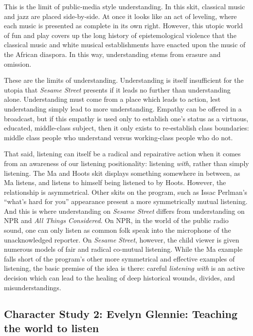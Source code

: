 \documentclass[12pt,letterpaper]{article}
\newcommand{\ses}{\textit{Sesame Street }}
\begin{document}
	This is the limit of public-media style understanding. In this skit, 
	classical music and jazz are placed side-by-side. At once it looks like
	an act of leveling, where each music is presented as complete in its own
	right. However, this utopic world of fun and play covers up the long 
	history of epistemological violence that the classical music and white 
	musical establishments have enacted upon the music of the African 
	diaspora. In this way, understanding stems from erasure and omission.

	These are the limits of understanding. Understanding is itself 
	insufficient for the utopia that \ses presents if it leads no further 
	than understanding alone. Understanding must come from a place which 
	leads to
	 action, lest understanding simply lead to more understanding. 
	Empathy can be offered in a 
	broadcast, but if this empathy is used only to establish one's status 
	as a virtuous, educated, middle-class subject, then it only exists to 
	re-establish class boundaries: middle class people who understand 
	versus working-class people who do not.  

	That said, listening can itself be a radical and repairative action when
	it comes from an awareness of our listening positionality: listening 
	\textit{with}, rather than simply listening. The Ma and Hoots skit 
	displays something somewhere in between, as Ma listens, and listens to 
	himself being listened to by Hoots. However, the relationship is 
	asymmetrical. Other skits on the program, such as Issac Perlman's 
	``what's hard for you'' appearance present a more symmetrically mutual 
	listening. And this is where understanding on \ses differs from 
	understanding on NPR and \textit{All Things Considered}. On NPR, in the
	world of the public radio sound, one can only listen as common folk 
	speak into the microphone of the unacknowledged reporter. On 
	\textit{Sesame Street}, 
	however, the child viewer is given numerous models of fair and radical 
	co-mutual listening. While the Ma example falls short of the program's 
	other more symmetrical and effective examples of listening, the basic 
	premise
	of the idea is there: careful \textit{listening with} is an active
	decision which can lead to the healing of deep historical wounds, 
	divides, and misunderstandings.

	\subsection*{Character Study 2: Evelyn Glennie: Teaching the world to
	 listen} 
\end{document}
